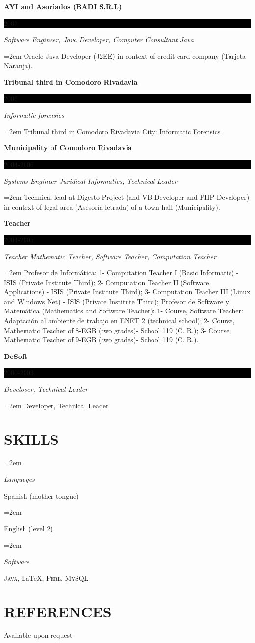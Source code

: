 \documentclass[paper=a4,fontsize=11pt]{scrartcl} %
\newlength{\spacebox}
\newcommand{\sepspace}{\vspace*{1em}}		%
\newcommand{\NewPart}[1]{\section*{\uppercase{#1}}}
\newcommand{\PersonalEntry}[2]{
		\noindent\hangindent=2em\hangafter=0 %
		\parbox{\spacebox}{        %
		\textit{#1}}		       %
		\hspace{1.5em} #2 \par}    %
\newcommand{\SkillsEntry}[2]{      %
		\noindent\hangindent=2em\hangafter=0 %
		\parbox{\spacebox}{        %
		\textit{#1}}			   %
		\hspace{1.5em} #2 \par}    %
\newcommand{\EducationEntry}[4]{
		\noindent \textbf{#1} \hfill      %
		\colorbox{Black}{%
			\parbox{6em}{%
			\hfill\color{White}#2}} \par  %
		\noindent \textit{#3} \par        %
		\noindent\hangindent=2em\hangafter=0 \small #4 %
		\normalsize \par}
\begin{document}
\EducationEntry{AYI and Asociados (BADI S.R.L)}{2007}{Software Engineer, Java Developer, Computer Consultant Java}
{Oracle Java Developer (J2EE) in context of credit card company (Tarjeta Naranja).}
\sepspace

\EducationEntry{Tribunal third in Comodoro Rivadavia}{2006}{Informatic forensics}{
Tribunal third in Comodoro Rivadavia City: Informatic Forensics}
\sepspace

\EducationEntry{Municipality of Comodoro Rivadavia}{2004-2006}{Systems Engineer Juridical Informatics, Technical Leader}
{Technical lead at Digesto Project (and VB Developer and PHP Developer) in context of legal area (Asesoría letrada) of a town hall (Municipality).}
\sepspace

\EducationEntry{Teacher}{2004-2005}{Teacher Mathematic Teacher, Software Teacher, Computation Teacher}
{Profesor de Informática: 1- Computation Teacher I (Basic Informatic) - ISIS (Private Institute Third); 2- Computation Teacher II (Software Applications) - ISIS (Private Institute Third); 3- Computation Teacher III (Linux and Windows Net) - ISIS (Private Institute Third); Profesor de Software y Matemática (Mathematics and Software Teacher): 1- Course, Software Teacher: Adaptación al ambiente de trabajo en ENET 2 (technical school); 2- Course, Mathematic Teacher of 8-EGB  (two grades)- School 119 (C. R.); 3- Course, Mathematic Teacher of 9-EGB (two grades)- School 119 (C. R.).
}
\sepspace

\EducationEntry{DeSoft}{2000-2003}{Developer, Technical Leader}{
Developer, Technical Leader}
\sepspace

\NewPart{Skills}{}

\SkillsEntry{Languages}{Spanish (mother tongue)}
\SkillsEntry{}{English (level 2)}


\SkillsEntry{Software}{
\textsc{Java}, \LaTeX, \textsc{Perl}, \textsc{MySQL}
}


\NewPart{References}{}
Available upon request
\end{document}
